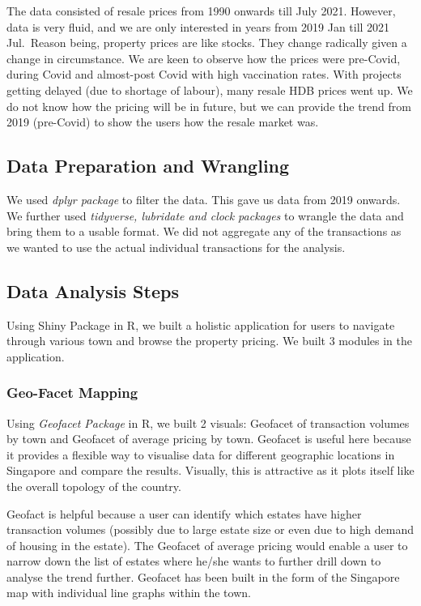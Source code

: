 \documentclass{acm_proc_article-sp}
\begin{document}
The data consisted of resale prices from 1990 onwards till July 2021.
However, data is very fluid, and we are only interested in years from
2019 Jan till 2021 Jul.~Reason being, property prices are like stocks.
They change radically given a change in circumstance. We are keen to
observe how the prices were pre-Covid, during Covid and almost-post
Covid with high vaccination rates. With projects getting delayed (due to
shortage of labour), many resale HDB prices went up. We do not know how
the pricing will be in future, but we can provide the trend from 2019
(pre-Covid) to show the users how the resale market was.

\hypertarget{data-preparation-and-wrangling}{%
\subsection{Data Preparation and
Wrangling}\label{data-preparation-and-wrangling}}

We used \emph{dplyr package} to filter the data. This gave us data from
2019 onwards. We further used \emph{tidyverse, lubridate and clock
packages} to wrangle the data and bring them to a usable format. We did
not aggregate any of the transactions as we wanted to use the actual
individual transactions for the analysis.

\hypertarget{data-analysis-steps}{%
\subsection{Data Analysis Steps}\label{data-analysis-steps}}

Using Shiny Package in R, we built a holistic application for users to
navigate through various town and browse the property pricing. We built
3 modules in the application.

\hypertarget{geo-facet-mapping}{%
\subsubsection{Geo-Facet Mapping}\label{geo-facet-mapping}}

Using \emph{Geofacet Package} in R, we built 2 visuals: Geofacet of
transaction volumes by town and Geofacet of average pricing by town.
Geofacet is useful here because it provides a flexible way to visualise
data for different geographic locations in Singapore and compare the
results. Visually, this is attractive as it plots itself like the
overall topology of the country.

Geofact is helpful because a user can identify which estates have higher
transaction volumes (possibly due to large estate size or even due to
high demand of housing in the estate). The Geofacet of average pricing
would enable a user to narrow down the list of estates where he/she
wants to further drill down to analyse the trend further. Geofacet has
been built in the form of the Singapore map with individual line graphs
within the town.
\end{document}
